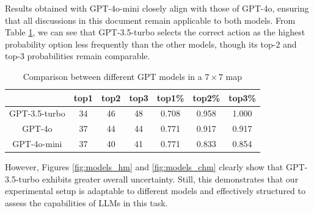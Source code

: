 Results obtained with GPT-4o-mini closely align with those of GPT-4o, ensuring
that all discussions in this document remain applicable to both models. From Table
\ref{tab:model_comparison}, we can see that GPT-3.5-turbo selects the correct
action as the highest probability option less frequently than the other models, though
its top-2 and top-3 probabilities remain comparable.

\vspace{5mm}
\begin{table}[ht]
  \centering
  \begin{tabular}{c|ccc|ccc}
    \hline
                  & top1 & top2 & top3 & top1\% & top2\% & top3\% \\
    \hline
    GPT-3.5-turbo & 34   & 46   & 48   & 0.708  & 0.958  & 1.000  \\
    GPT-4o        & 37   & 44   & 44   & 0.771  & 0.917  & 0.917  \\
    GPT-4o-mini   & 37   & 40   & 41   & 0.771  & 0.833  & 0.854  \\
    \hline
  \end{tabular}
  \caption{Comparison between different GPT models in a $7 \times 7$ map}
  \label{tab:model_comparison}
\end{table}
\vspace{5mm}

However, Figures \ref{fig:models_hm} and \ref{fig:models_chm} clearly show that GPT-3.5-turbo
exhibits greater overall uncertainty. Still, this demonstrates that our experimental
setup is adaptable to different models and effectively structured to assess the capabilities
of LLMs in this task.

